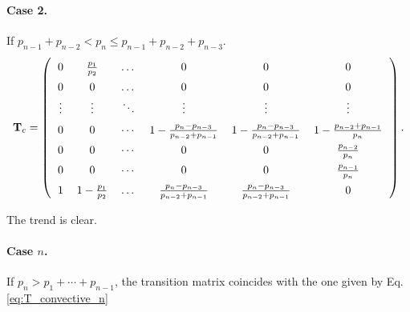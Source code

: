 \documentclass[12pt]{article}
\begin{document}
\paragraph{Case 2.}

If $p_{n-1} + p_{n-2} < p_n \le p_{n-1} + p_{n-2} + p_{n-3}$.
$$
  \mathbf T_{c}
=
\left(
  \arraycolsep=6.0pt\def\arraystretch{1.5}
  \begin{array}{ccccccc}
    0  & \frac{p_1}{p_2}   &   \dots  & 0  & 0 & 0\\
    0  &   0   &   \dots  &  0 & 0 & 0\\
    \vdots&\vdots &   \ddots &   \vdots & \vdots & \vdots \\
    0 & 0 &   \cdots &
    1 - \frac{ p_n - p_{n-3} } { p_{n-2} + p_{n-1}} &
    1 - \frac{ p_n - p_{n-3} } { p_{n-2} + p_{n-1}} &
    1 - \frac{p_{n-2} + p_{n-1}}{p_n}\\
    0 & 0 &   \cdots &  0 & 0 & \frac{p_{n-2}}{p_n}\\
    0 & 0 &   \cdots &  0 & 0 & \frac{p_{n-1}}{p_n}\\
    1 &  1 - \frac{p_1}{p_2} &   \dots  &
    \frac{p_n - p_{n-3}}{p_{n-2} + p_{n-1}} &
    \frac{p_n - p_{n-3}}{p_{n-2} + p_{n-1}} & 0
  \end{array}
\right).
$$

The trend is clear.

\paragraph{Case $n$.}

If $p_n > p_1 + \cdots + p_{n-1}$,
the transition matrix coincides
with the one given by Eq. \eqref{eq:T_convective_n}
\end{document}
